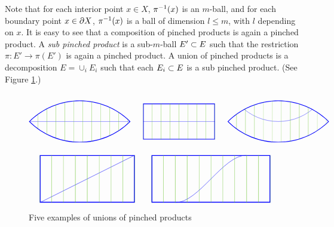 Note that for each interior point $x\in X$, $\pi^{-1}(x)$ is an $m$-ball,
and for each boundary point $x\in\partial X$, $\pi^{-1}(x)$ is a ball of dimension
$l \le m$, with $l$ depending on $x$.
It is easy to see that a composition of pinched products is again a pinched product.
A {\it sub pinched product} is a sub-$m$-ball $E'\subset E$ such that the restriction
$\pi:E'\to \pi(E')$ is again a pinched product.
A {union} of pinched products is a decomposition $E = \cup_i E_i$
such that each $E_i\subset E$ is a sub pinched product.
(See Figure \ref{pinched_prod_unions}.)
\begin{figure}[t]
$$
\begin{tikzpicture}[baseline=0]
\begin{scope}
\path[clip] (0,0) arc (135:45:4) arc (-45:-135:4);
\draw[blue,line width=2pt] (0,0) arc (135:45:4) arc (-45:-135:4);
\draw[blue] (0,0) -- (5.66,0);
\foreach \x in {0, 0.5, ..., 6} {
	\draw[green!50!brown] (\x,-2) -- (\x,2);
}
\end{scope}
\end{tikzpicture}
\qquad
\begin{tikzpicture}[baseline=0]
\begin{scope}
\path[clip] (0,-1) rectangle (4,1);
\draw[blue,line width=2pt] (0,-1) rectangle (4,1);
\draw[blue] (0,0) -- (5,0);
\foreach \x in {0, 0.5, ..., 6} {
	\draw[green!50!brown] (\x,-2) -- (\x,2);
}
\end{scope}
\end{tikzpicture}
\qquad
\begin{tikzpicture}[baseline=0]
\begin{scope}
\path[clip] (0,0) arc (135:45:4) arc (-45:-135:4);
\draw[blue,line width=2pt] (0,0) arc (135:45:4) arc (-45:-135:4);
\draw[blue] (2.83,3) circle (3);
\foreach \x in {0, 0.5, ..., 6} {
	\draw[green!50!brown] (\x,-2) -- (\x,2);
}
\end{scope}
\end{tikzpicture}
$$
$$
\begin{tikzpicture}[baseline=0]
\begin{scope}
\path[clip] (0,-1) rectangle (4,1);
\draw[blue,line width=2pt] (0,-1) rectangle (4,1);
\draw[blue] (0,-1) -- (4,1);
\foreach \x in {0, 0.5, ..., 6} {
	\draw[green!50!brown] (\x,-2) -- (\x,2);
}
\end{scope}
\end{tikzpicture}
\qquad
\begin{tikzpicture}[baseline=0]
\begin{scope}
\path[clip] (0,-1) rectangle (5,1);
\draw[blue,line width=2pt] (0,-1) rectangle (5,1);
\draw[blue] (1,-1) .. controls  (2,-1) and (3,1) .. (4,1);
\foreach \x in {0, 0.5, ..., 6} {
	\draw[green!50!brown] (\x,-2) -- (\x,2);
}
\end{scope}
\end{tikzpicture}
$$
\caption{Five examples of unions of pinched products}\label{pinched_prod_unions}
\end{figure}

